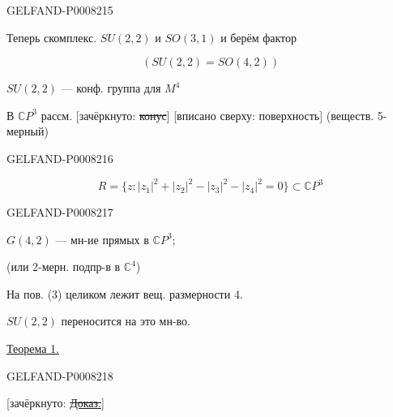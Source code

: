 \begin{GelfandAdjacentEvidence}{GELFAND-P000821}{5}


Теперь скомплекс. \(SU(2,2)\) и \(SO(3,1)\) и берём фактор

\begin{equation*}
(SU(2,2)=SO(4,2))\tag{2}
\end{equation*}

\(SU(2,2)\) — конф. группа для \(M^4\)


В \(\mathbb{C}P^3\) рассм. [зачёркнуто: \sout{конус}]
[вписано сверху: поверхность] (веществ. 5-мерный)
\end{GelfandAdjacentEvidence}
\begin{GelfandAdjacentEvidence}{GELFAND-P000821}{6}


\begin{equation*}
R=\{z:|z_1|^2+|z_2|^2-|z_3|^2-|z_4|^2=0\}\subset\mathbb{C}P^3
\tag{3}
\end{equation*}

\end{GelfandAdjacentEvidence}
\begin{GelfandAdjacentEvidence}{GELFAND-P000821}{7}


\(G(4,2)\) — мн-ие прямых в \(\mathbb{C}P^3\);

(или 2-мерн. подпр-в в \(\mathbb{C}^4\))

На пов. (3) целиком лежит  вещ. размерности 4.

\(SU(2,2)\) переносится на это мн-во.

\uline{Теорема 1.} 
\end{GelfandAdjacentEvidence}
\begin{GelfandAdjacentEvidence}{GELFAND-P000821}{8}


[зачёркнуто: \sout{\uline{Доказ.}}]
\end{GelfandAdjacentEvidence}


